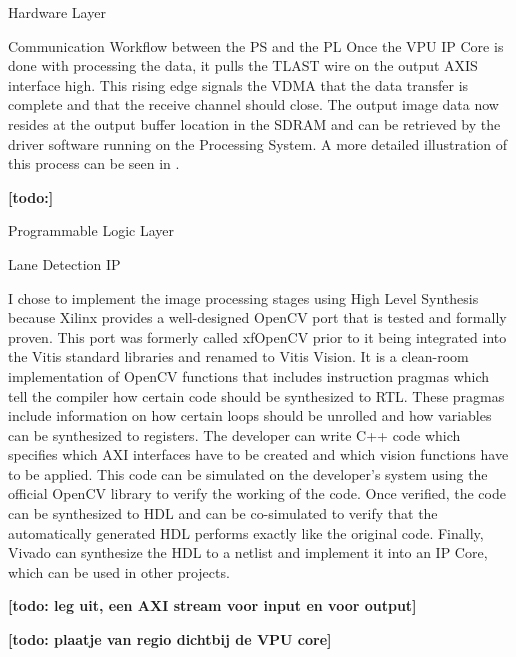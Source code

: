 \documentclass{matthijs}
\begin{document}
\begin{hoofdstuk}{Hardware Layer}
\begin{paragraaf}{Communication Workflow between the PS and the PL}
			Once the VPU IP Core is done with processing the data, it pulls the TLAST wire on the output AXIS interface high.
			This rising edge signals the VDMA that the data transfer is complete and that the receive channel should close.
			The output image data now resides at the output buffer location in the SDRAM and can be retrieved by the driver software running on the Processing System.
			A more detailed illustration of this process can be seen in .

		\end{paragraaf}

		\textbf{[todo:]}

	\end{hoofdstuk}

	\begin{hoofdstuk}{Programmable Logic Layer}

		\begin{paragraaf}{Lane Detection IP}

			I chose to implement the image processing stages using High Level Synthesis because Xilinx provides a well-designed OpenCV port that is tested and formally proven.
			This port was formerly called xfOpenCV prior to it being integrated into the Vitis standard libraries and renamed to Vitis Vision.
			It is a clean-room implementation of OpenCV functions that includes instruction pragmas which tell the compiler how certain code should be synthesized to RTL.
			These pragmas include information on how certain loops should be unrolled and how variables can be synthesized to registers.
			The developer can write C++ code which specifies which AXI interfaces have to be created and which vision functions have to be applied.
			This code can be simulated on the developer's system using the official OpenCV library to verify the working of the code.
			Once verified, the code can be synthesized to HDL and can be co-simulated to verify that the automatically generated HDL performs exactly like the original code.
			Finally, Vivado can synthesize the HDL to a netlist and implement it into an IP Core, which can be used in other projects.
			

			\bigskip

			\textbf{[todo: leg uit, een AXI stream voor input en voor output]}

			\bigskip

			\textbf{[todo: plaatje van regio dichtbij de VPU core]}


\end{paragraaf}
\end{hoofdstuk}
\end{document}
